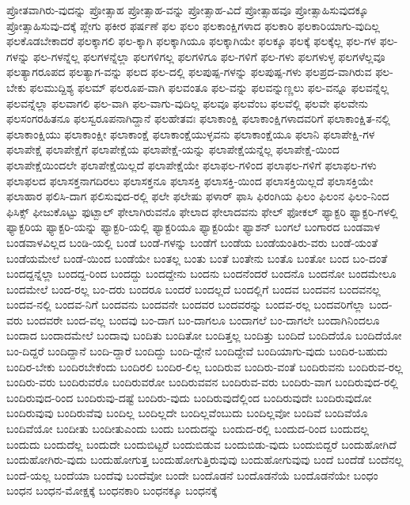 {ಪ್ರೋತವಾಗಿರು-ವುದನ್ನು
ಪ್ರೋತ್ಸಾಹ
ಪ್ರೋತ್ಸಾಹ-ವನ್ನು
ಪ್ರೋತ್ಸಾಹ-ವಿದೆ
ಪ್ರೋತ್ಸಾಹವೂ
ಪ್ರೋತ್ಸಾಹಿಸುವುದಕ್ಕೂ
ಪ್ರೋತ್ಸಾಹಿಸುವು-ದಕ್ಕೆ
ಪ್ಲೇಗು
ಫಕೀರ
ಫರ್ಷಣೆ
ಫಲ
ಫಲಂ
ಫಲಕಾಂಕ್ಷಿಗಳಾದ
ಫಲಕಾರಿ
ಫಲಕಾರಿಯಾಗು-ವುದಿಲ್ಲ
ಫಲಕೊಡಬೇಕಾದರೆ
ಫಲಕ್ಕಾಗಲಿ
ಫಲ-ಕ್ಕಾಗಿ
ಫಲಕ್ಕಾಗಿಯೂ
ಫಲಕ್ಕಾಗಿಯೇ
ಫಲಕ್ಕೂ
ಫಲಕ್ಕೆ
ಫಲಕ್ಕೆಲ್ಲ
ಫಲ-ಗಳ
ಫಲ-ಗಳನ್ನು
ಫಲ-ಗಳನ್ನೆಲ್ಲ
ಫಲಗಳನ್ನೆಲ್ಲಾ
ಫಲಗಳಿಗಲ್ಲ
ಫಲಗಳಿಗೂ
ಫಲ-ಗಳಿಗೆ
ಫಲ-ಗಳು
ಫಲಗಳುಳ್ಳ
ಫಲಗಳೆಲ್ಲವೂ
ಫಲತ್ಯಾಗರೂಪದ
ಫಲತ್ಯಾಗ-ವನ್ನು
ಫಲದ
ಫಲ-ದಲ್ಲಿ
ಫಲಪುಷ್ಪ-ಗಳನ್ನು
ಫಲಪುಷ್ಪ-ಗಳು
ಫಲಪ್ರದ-ವಾಗಿರುವ
ಫಲ-ಬೇಕು
ಫಲಮುದ್ದಿಶ್ಯ
ಫಲಮ್
ಫಲರೂಪ-ವಾಗಿ
ಫಲವಂತೂ
ಫಲ-ವನ್ನು
ಫಲವನ್ನುಣ್ಣಲು
ಫಲ-ವನ್ನೂ
ಫಲವನ್ನೆಲ್ಲ
ಫಲವನ್ನೆಲ್ಲಾ
ಫಲವಾಗಲಿ
ಫಲ-ವಾಗಿ
ಫಲ-ವಾಗು-ವುದಿಲ್ಲ
ಫಲವೂ
ಫಲವೆಂಬ
ಫಲವೆಲ್ಲಿ
ಫಲವೇ
ಫಲವೇನು
ಫಲಸಂಗರಹಿತನೂ
ಫಲಸ್ವರೂಪನಾಗಿದ್ದಾನೆ
ಫಲಹೇತವಃ
ಫಲಾಕಾಂಕ್ಷಿ
ಫಲಾಕಾಂಕ್ಷಿಗಳಾದವರಿಗೆ
ಫಲಾಕಾಂಕ್ಷಿತ-ನಲ್ಲಿ
ಫಲಾಕಾಂಕ್ಷಿಯು
ಫಲಾಕಾಂಕ್ಷೀ
ಫಲಾಕಾಂಕ್ಷೆ
ಫಲಾಕಾಂಕ್ಷೆಯುಳ್ಳವನು
ಫಲಾಕಾಂಕ್ಷೆಯೂ
ಫಲಾನಿ
ಫಲಾಪೇಕ್ಷಿ-ಗಳ
ಫಲಾಪೇಕ್ಷೆ
ಫಲಾಪೇಕ್ಷೆಗೆ
ಫಲಾಪೇಕ್ಷೆಯ
ಫಲಾಪೇಕ್ಷೆ-ಯನ್ನು
ಫಲಾಪೇಕ್ಷೆಯನ್ನೆಲ್ಲ
ಫಲಾಪೇಕ್ಷೆ-ಯಿಂದ
ಫಲಾಪೇಕ್ಷೆಯಿಂದಲೇ
ಫಲಾಪೇಕ್ಷೆಯಿಲ್ಲದೆ
ಫಲಾಪೇಕ್ಷೆಯೇ
ಫಲಾಫಲ-ಗಳಿಂದ
ಫಲಾಫಲ-ಗಳಿಗೆ
ಫಲಾಫಲ-ಗಳು
ಫಲಾಫಲದ
ಫಲಾಸಕ್ತನಾಗದಿರಲು
ಫಲಾಸಕ್ತನೂ
ಫಲಾಸಕ್ತಿ
ಫಲಾಸಕ್ತಿ-ಯಿಂದ
ಫಲಾಸಕ್ತಿಯಿಲ್ಲದೆ
ಫಲಾಸಕ್ತಿಯೇ
ಫಲಾಹಾರ
ಫಲಿಸಿ-ದಾಗ
ಫಲಿಸುವುದ-ರಲ್ಲಿ
ಫಲೇ
ಫಲೇಷು
ಫಳಾರ್
ಫಾಸಿ
ಫಿರಂಗಿಯ
ಫಿಲಂ
ಫಿಲಂನ
ಫಿಲಂ-ನಿಂದ
ಫಿಸಿಕ್ಸ್
ಫೀಜುಕೊಟ್ಟು
ಫುಟ್ಬಾಲ್
ಫೇಲಾಗಿರುವನೊ
ಫೇಲಾದ
ಫೇಲಾದವನು
ಫೇಲ್
ಫೋಕಲ್
ಫ್ಯಾಕ್ಟರಿ
ಫ್ಯಾಕ್ಟರಿ-ಗಳಲ್ಲಿ
ಫ್ಯಾಕ್ಟರಿಯ
ಫ್ಯಾಕ್ಟರಿ-ಯನ್ನು
ಫ್ಯಾಕ್ಟರಿ-ಯಲ್ಲಿ
ಫ್ಯಾಕ್ಟರಿಯೂ
ಫ್ಯಾಕ್ಟರಿಯೇ
ಫ್ಯಾಶನ್
ಬಂಗಲೆ
ಬಂಗಾರದ
ಬಂಡವಾಳ
ಬಂಡವಾಳವಿಲ್ಲದ
ಬಂಡಿ-ಯಲ್ಲಿ
ಬಂಡೆ
ಬಂಡೆ-ಗಳನ್ನು
ಬಂಡೆಗೆ
ಬಂಡೆಯ
ಬಂಡೆಯಂತಿರು-ವರು
ಬಂಡೆ-ಯಂತೆ
ಬಂಡೆಯಮೇಲೆ
ಬಂಡೆ-ಯಿಂದ
ಬಂಡೆಯೇ
ಬಂತಲ್ಲ
ಬಂತು
ಬಂತೆ
ಬಂತೇನು
ಬಂತೊ
ಬಂತೋ
ಬಂದ
ಬಂ-ದಂತೆ
ಬಂದದ್ದನ್ನೆಲ್ಲಾ
ಬಂದದ್ದ-ರಿಂದ
ಬಂದದ್ದು
ಬಂದದ್ದೇನು
ಬಂದನು
ಬಂದನೆಂದರೆ
ಬಂದನೊ
ಬಂದನೋ
ಬಂದಮೇಲೂ
ಬಂದಮೇಲೆ
ಬಂದ-ರಲ್ಲ
ಬಂ-ದರು
ಬಂದರೂ
ಬಂದರೆ
ಬಂದಲ್ಲದೆ
ಬಂದಲ್ಲಿಗೆ
ಬಂದವ
ಬಂದವನ
ಬಂದವನಲ್ಲ
ಬಂದವ-ನಲ್ಲಿ
ಬಂದವ-ನಿಗೆ
ಬಂದವನು
ಬಂದವನೇ
ಬಂದವರ
ಬಂದವರನ್ನು
ಬಂದವ-ರಲ್ಲ
ಬಂದವರಿಗೆಲ್ಲಾ
ಬಂದ-ವರು
ಬಂದವರೇ
ಬಂದ-ವಲ್ಲ
ಬಂದವು
ಬಂ-ದಾಗ
ಬಂ-ದಾಗಲೂ
ಬಂದಾಗಲೆ
ಬಂ-ದಾಗಲೇ
ಬಂದಾಗಿನಿಂದಲೂ
ಬಂದಾದ
ಬಂದಾದಮೇಲೆ
ಬಂದಾವು
ಬಂದಿತು
ಬಂದಿತೋ
ಬಂದಿತ್ತಲ್ಲ
ಬಂದಿತ್ತು
ಬಂದಿದೆ
ಬಂದಿದೆಯೊ
ಬಂದಿದೆಯೋ
ಬಂ-ದಿದ್ದರೆ
ಬಂದಿದ್ದಾನೆ
ಬಂದಿ-ದ್ದಾರೆ
ಬಂದಿದ್ದು
ಬಂದಿ-ದ್ದೇನೆ
ಬಂದಿದ್ದೇವೆ
ಬಂದಿಯಾಗು-ವುದು
ಬಂದಿರ-ಬಹುದು
ಬಂದಿರ-ಬೇಕು
ಬಂದಿರಬೇಕೆಂದು
ಬಂದಿರಲಿ
ಬಂದಿರ-ಲಿಲ್ಲ
ಬಂದಿರುವ
ಬಂದಿರು-ವಂತೆ
ಬಂದಿರುವನು
ಬಂದಿರುವ-ರಲ್ಲ
ಬಂದಿರು-ವರು
ಬಂದಿರುವರೊ
ಬಂದಿರುವರೋ
ಬಂದಿರುವವನ
ಬಂದಿರುವ-ವರು
ಬಂದಿರು-ವಾಗ
ಬಂದಿರುವುದ-ರಲ್ಲಿ
ಬಂದಿರುವುದ-ರಿಂದ
ಬಂದಿರುವು-ದಷ್ಟೆ
ಬಂದಿರು-ವುದು
ಬಂದಿರುವುದೆಲ್ಲಿಂದ
ಬಂದಿರುವುದೇ
ಬಂದಿರುವುದೋ
ಬಂದಿರುವುವು
ಬಂದಿರುವೆವು
ಬಂದಿಲ್ಲ
ಬಂದಿಲ್ಲದೇ
ಬಂದಿಲ್ಲವೆಂಬುದು
ಬಂದಿಲ್ಲವೋ
ಬಂದಿವೆ
ಬಂದಿವೆಯೊ
ಬಂದಿವೆಯೋ
ಬಂದೀತು
ಬಂದೀತುಎಂದು
ಬಂದು
ಬಂದುದನ್ನು
ಬಂದುದ-ರಲ್ಲಿ
ಬಂದುದ-ರಿಂದ
ಬಂದುದಲ್ಲ
ಬಂದುದು
ಬಂದುದೆಲ್ಲ
ಬಂದುದೇ
ಬಂದುಬಿಟ್ಟರೆ
ಬಂದುಬಿಡುವ
ಬಂದುಬಿಡು-ವುದು
ಬಂದುಬಿದ್ದರೆ
ಬಂದುಹೋಗಿದೆ
ಬಂದುಹೋಗಿರು-ವುದು
ಬಂದುಹೋಗುತ್ತ
ಬಂದುಹೋಗುತ್ತಿರುವುವು
ಬಂದುಹೋಗುವುವು
ಬಂದೆ
ಬಂದೆಡೆ
ಬಂದೆನಲ್ಲ
ಬಂದೆ-ಯಲ್ಲ
ಬಂದೆಯಾ
ಬಂದೆವು
ಬಂದೆವೋ
ಬಂದೇ
ಬಂದೊಡನೆ
ಬಂದೊಡನೆಯೆ
ಬಂದೊಡನೆಯೇ
ಬಂಧಂ
ಬಂಧನ
ಬಂಧನ-ಮೋಕ್ಷಕ್ಕೆ
ಬಂಧನಕಾರಿ
ಬಂಧನಕ್ಕೂ
ಬಂಧನಕ್ಕೆ
}
